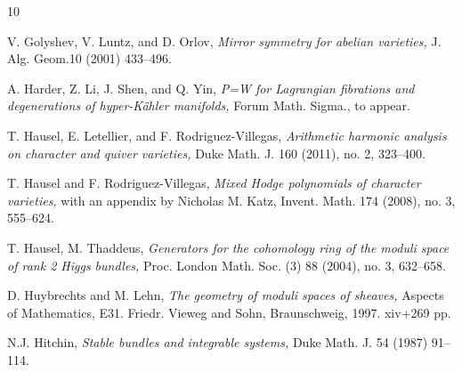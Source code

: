 \documentclass[11pt]{amsart}
\theoremstyle{plain}
\theoremstyle{definition}
\theoremstyle{remark}
\begin{document}
\begin{thebibliography}{10}

 V. Golyshev, V. Luntz, and D. Orlov, {\em Mirror symmetry for abelian varieties,} J. Alg. Geom.10 (2001) 433--496.

 A. Harder, Z. Li, J. Shen, and Q. Yin, {\em P=W for Lagrangian fibrations and degenerations of hyper-K\"ahler manifolds,} Forum Math. Sigma., to appear.

 T. Hausel, E. Letellier, and F. Rodriguez-Villegas, {\em Arithmetic harmonic analysis on character and quiver varieties,} Duke Math. J. 160 (2011), no. 2, 323--400.

 T. Hausel and F. Rodriguez-Villegas, {\em Mixed Hodge polynomials of character varieties,} with an appendix by Nicholas M. Katz, Invent. Math. 174 (2008), no. 3, 555--624. 



 T. Hausel, M. Thaddeus, {\em Generators for the cohomology ring of the moduli space of rank 2 Higgs bundles,} Proc. London Math. Soc. (3) 88 (2004), no. 3, 632--658. 


 D. Huybrechts and M. Lehn, {\em The geometry of moduli spaces of sheaves,} Aspects of Mathematics, E31. Friedr. Vieweg and Sohn, Braunschweig, 1997. xiv+269 pp.



 N.J. Hitchin, {\em Stable bundles and integrable systems,} Duke Math. J. 54 (1987) 91--114.






\end{thebibliography}
\end{document}
